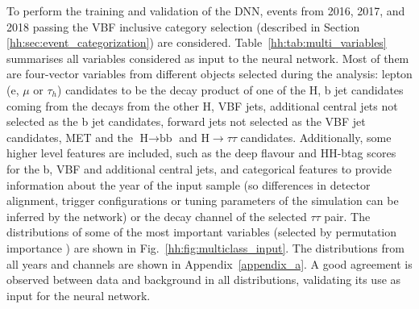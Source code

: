 \documentclass[../main.tex]{subfiles}
\begin{document}
To perform the training and validation of the DNN, events from 2016, 2017, and 2018 passing the VBF inclusive category selection (described in Section \ref{hh:sec:event_categorization}) are considered. Table~\ref{hh:tab:multi_variables} summarises all variables considered as input to the neural network. Most of them are four-vector variables from different objects selected during the analysis: lepton (e, $\mu$ or $\tau_h$) candidates to be the decay product of one of the H, b jet candidates coming from the decays from the other H, VBF jets, additional central jets not selected as the b jet candidates, forward jets not selected as the VBF jet candidates, MET and the $\text{H}\to\text{bb}$ and $\text{H}\to\tau\tau$ candidates. Additionally, some higher level features are included, such as the deep flavour and HH-btag scores for the b, VBF and additional central jets, and categorical features to provide information about the year of the input sample (so differences in detector alignment, trigger configurations or tuning parameters of the simulation can be inferred by the network) or the decay channel of the selected $\tau\tau$ pair. The distributions of some of the most important variables (selected by permutation importance \cite{hh:analysis:permutation_importance}) are shown in Fig.~\ref{hh:fig:multiclass_input}. The distributions from all years and channels are shown in Appendix~\ref{appendix_a}. A good agreement is observed between data and background in all distributions, validating its use as input for the neural network.
\end{document}
